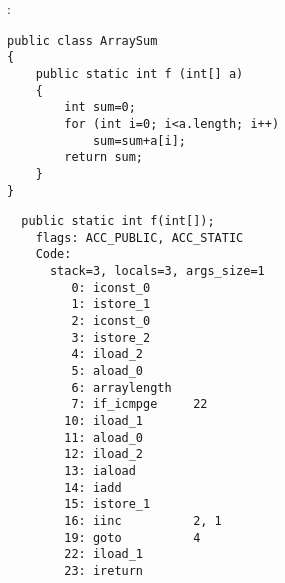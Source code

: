 
:

\begin{lstlisting}
public class ArraySum
{
	public static int f (int[] a)
	{
		int sum=0;
		for (int i=0; i<a.length; i++)
			sum=sum+a[i];
		return sum;
	}
}
\end{lstlisting}

\begin{lstlisting}
  public static int f(int[]);
    flags: ACC_PUBLIC, ACC_STATIC
    Code:
      stack=3, locals=3, args_size=1
         0: iconst_0      
         1: istore_1      
         2: iconst_0      
         3: istore_2      
         4: iload_2       
         5: aload_0       
         6: arraylength   
         7: if_icmpge     22
        10: iload_1       
        11: aload_0       
        12: iload_2       
        13: iaload        
        14: iadd          
        15: istore_1      
        16: iinc          2, 1
        19: goto          4
        22: iload_1       
        23: ireturn       
\end{lstlisting}

